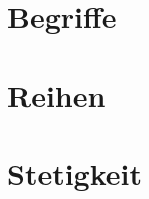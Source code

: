 \documentclass[final, 12pt]{article}
\begin{document}
  

\section{Begriffe}



\section{Reihen}


\section{Stetigkeit}




\newpage
\end{document}
